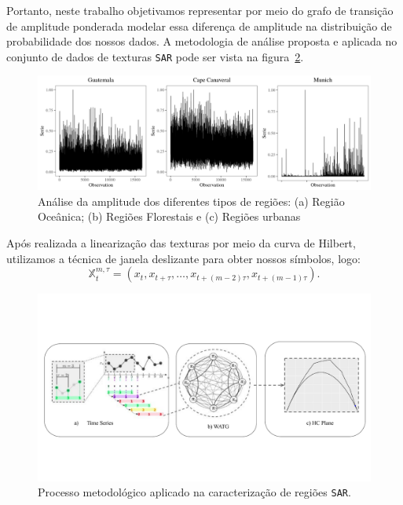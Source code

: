\documentclass[12pt]{article}
\begin{document}
Portanto, neste trabalho objetivamos representar por meio do grafo de transição de amplitude ponderada modelar essa diferença de amplitude na distribuição de probabilidade dos nossos dados.
A metodologia de análise proposta e aplicada no conjunto de dados de texturas \texttt{SAR} pode ser vista na figura~\ref{fig:WATG}.

\begin{figure}[hbt]
	\centering
	\includegraphics[scale = 0.5]{Figures/SAR_signal.pdf}
    \caption{Análise da amplitude dos diferentes tipos de regiões: (a) Região Oceânica; (b) Regiões Florestais e (c) Regiões urbanas}
    \label{fig:AmplitudeSAR}
\end{figure}

Após realizada a linearização das texturas por meio da curva de Hilbert, utilizamos a técnica de janela deslizante para obter nossos símbolos, logo:
\begin{equation}
    \mathbb{X}_t^{m,\tau} = (x_{t}, x_{t+\tau},\ldots, x_{t+(m-2)\tau} ,x_{t+(m-1)\tau}).
\end{equation}

\begin{figure}[hbt]
	\centering
	\includegraphics[scale = 0.45]{Figures/WATG.pdf}
    \caption{Processo metodológico aplicado na caracterização de regiões \texttt{SAR}.}
    \label{fig:WATG}
\end{figure}
\end{document}

